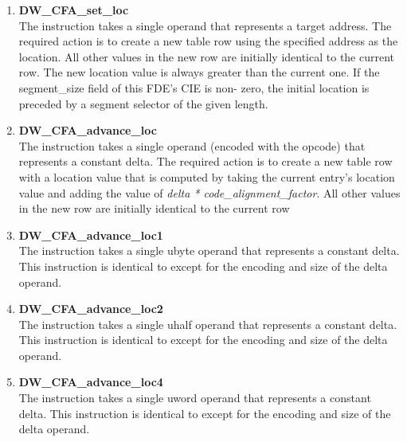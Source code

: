 \begin{enumerate}[1.]

\item \textbf{DW\-\_CFA\-\_set\-\_loc} \\
The  instruction takes a single operand that
represents a target address. The required action is to create a
new table row using the specified address as the location. All
other values in the new row are initially identical to the
current row. The new location value is always greater than
the current one. If the segment\_size field of this FDE's CIE
is non- zero, the initial location is preceded by a segment
selector of the given length.


\item \textbf{DW\-\_CFA\-\_advance\-\_loc} \\
The  instruction takes a single operand (encoded
with the opcode) that represents a constant delta. The required
action is to create a new table row with a location value that
is computed by taking the current entry’s location value
and adding the value of 
\textit{delta * code\_alignment\_factor}. All
other values in the new row are initially identical to the
current row

\item \textbf{DW\-\_CFA\-\_advance\-\_loc1} \\
The  instruction takes a single ubyte
operand that represents a constant delta. This instruction
is identical to  except for the encoding
and size of the delta operand.

\item \textbf{DW\-\_CFA\-\_advance\-\_loc2} \\
The  instruction takes a single uhalf
operand that represents a constant delta. This instruction
is identical to  except for the encoding
and size of the delta operand.

\item \textbf{DW\-\_CFA\-\_advance\-\_loc4} \\
The  instruction takes a single uword
operand that represents a constant delta. This instruction
is identical to  except for the encoding
and size of the delta operand.

\end{enumerate}

